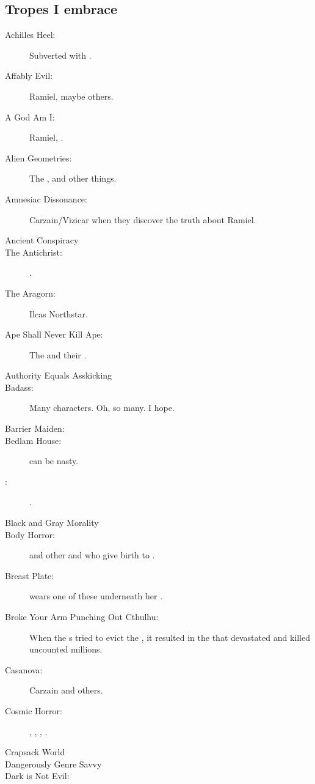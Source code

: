 \begin{flushleft}
\section{Tropes I embrace}
\begin{description}
  \item[Achilles Heel:] Subverted with \Ishnaruchaefir. 
  \item[Affably Evil:] Ramiel, maybe others.
  \item[A God Am I:] Ramiel, \HriistD. 
  \item[Alien Geometries:] 
    The , and other things. 
  \item[Amnesiac Dissonance:] 
    Carzain/Vizicar when they discover the truth about Ramiel.
  \item[Ancient Conspiracy] 
  \item[The Antichrist:]
    \Thanatzil. 
  \item[The Aragorn:] Ilcas Northstar.
  \item[Ape Shall Never Kill Ape:] 
    The \dragons{} and their . 
  \item[Authority Equals Asskicking]  
  \item[Badass:] 
    Many characters. 
    Oh, so many. 
    I hope. 
  \item[Barrier Maiden:] \Triestessakhin 
  \item[Bedlam House:]  can be nasty. 
  \item[\Bishounen:] \Teshrial. 
  \item[Black and Gray Morality]
  \item[Body Horror:] 
    \Ilu{} and other \nephilim{} and \humans{} who give birth to \resphain.
  \item[Breast Plate:] 
     wears one of these underneath her .
  \item[Broke Your Arm Punching Out Cthulhu:]
    When the \Miithian s tried to evict the \banes, it resulted in the \SecondShrouding{} that devastated \Miith{} and killed uncounted millions. 
  \item[Casanova:] Carzain and others. 
  \item[Cosmic Horror:] 
    , , , \banelords.
  \item[Crapsack World]
  \item[Dangerously Genre Savvy] 
  \item[Dark is Not Evil:] 

\end{description}
\end{flushleft}
